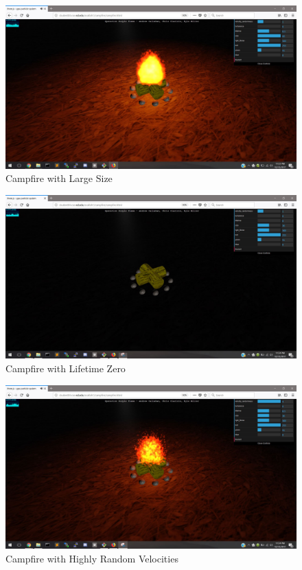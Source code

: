 \documentclass[letterpaper]{article}
\begin{document}
\begin{figure}[H]
\centering
\includegraphics[scale=.35]{result7.JPG}
\caption{Campfire with Large Size}
\label{fig:result7}
\end{figure}

\begin{figure}[H]
\centering
\includegraphics[scale=.35]{result8.JPG}
\caption{Campfire with Lifetime Zero}
\label{fig:result8}
\end{figure}

\begin{figure}[H]
\centering
\includegraphics[scale=.35]{result9.JPG}
\caption{Campfire with Highly Random Velocities}
\label{fig:result9}
\end{figure}
\end{document}
